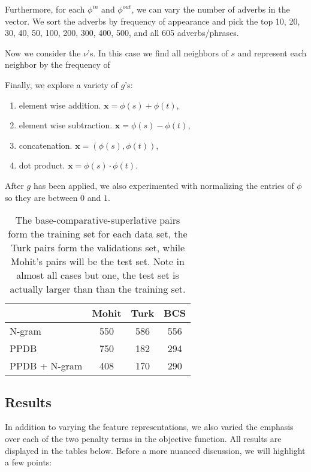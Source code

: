 Furthermore, for each $\phi^{in}$ and $\phi^{out}$, we can vary the number of adverbs in the vector. We sort the adverbs by frequency of appearance and pick the top 10, 20, 30, 40, 50, 100, 200, 300, 400, 500, and all 605 adverbs/phrases. 

Now we consider the $\nu$'s. In this case we find all neighbors of $s$ and represent each neighbor by the frequency of 


Finally, we explore a variety of $g$'s:

\begin{enumerate}
	\item element wise addition. $\pmb{x} = \phi(s) + \phi(t)$,
	\item element wise subtraction. $\pmb{x} = \phi(s) - \phi(t)$,
	\item concatenation. $\pmb{x} = (\phi(s), \phi(t))$,
	\item dot product. $\pmb{x} = \phi(s) \cdot \phi(t)$.
\end{enumerate}

After $g$ has been applied, we also experimented with normalizing the entries of $\phi$ so they are between $0$ and $1$. 


\begin{table}
\small
\centering
\begin{tabular}{|l|c|c|c|}
	\hline 
	& \multicolumn{1}{c|}{Mohit} 
	& \multicolumn{1}{c|}{Turk} 
	& \multicolumn{1}{c|}{BCS} \\
	\hline 
	N-gram          & 550 & 586 & 556 \\
	PPDB            & 750 & 182 & 294 \\
	PPDB + N-gram   & 408 & 170 & 290 \\
	\hline
\end{tabular}
\caption{\label{font-table} The base-comparative-superlative pairs form the training set for each data set, the Turk pairs form the validations set, while Mohit's pairs will be the test set. Note in almost all cases but one, the test set is actually larger than than the training set. }
\end{table}


\subsection{Results}

In addition to varying the feature representations, we also varied the emphasis over each of the two penalty terms in the objective function. All results are displayed in the tables below. Before a more nuanced discussion, we will highlight a few points:

